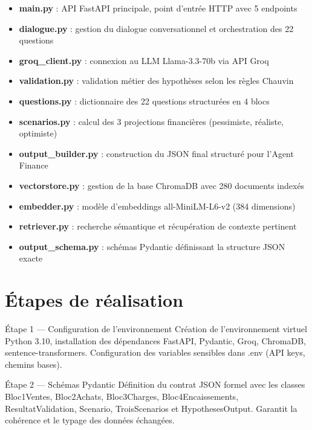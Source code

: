 \documentclass[12pt, a4paper]{report}
\begin{document}
\begin{itemize}
  \item \textbf{main.py} : API FastAPI principale, point d'entrée HTTP avec 5 endpoints
  \item \textbf{dialogue.py} : gestion du dialogue conversationnel et orchestration des 22 questions
  \item \textbf{groq\_client.py} : connexion au LLM Llama-3.3-70b via API Groq
  \item \textbf{validation.py} : validation métier des hypothèses selon les règles Chauvin
  \item \textbf{questions.py} : dictionnaire des 22 questions structurées en 4 blocs
  \item \textbf{scenarios.py} : calcul des 3 projections financières (pessimiste, réaliste, optimiste)
  \item \textbf{output\_builder.py} : construction du JSON final structuré pour l'Agent Finance
  \item \textbf{vectorstore.py} : gestion de la base ChromaDB avec 280 documents indexés
  \item \textbf{embedder.py} : modèle d'embeddings all-MiniLM-L6-v2 (384 dimensions)
  \item \textbf{retriever.py} : recherche sémantique et récupération de contexte pertinent
  \item \textbf{output\_schema.py} : schémas Pydantic définissant la structure JSON exacte
\end{itemize}

\section{Étapes de réalisation}

\begin{stepbox}{Étape 1 — Configuration de l'environnement}
Création de l'environnement virtuel Python 3.10, installation des dépendances FastAPI, Pydantic, Groq, ChromaDB, sentence-transformers. Configuration des variables sensibles dans .env (API keys, chemins bases).
\end{stepbox}

\begin{stepbox}{Étape 2 — Schémas Pydantic}
Définition du contrat JSON formel avec les classes Bloc1Ventes, Bloc2Achats, Bloc3Charges, Bloc4Encaissements, ResultatValidation, Scenario, TroisScenarios et HypothesesOutput. Garantit la cohérence et le typage des données échangées.
\end{stepbox}
\end{document}
